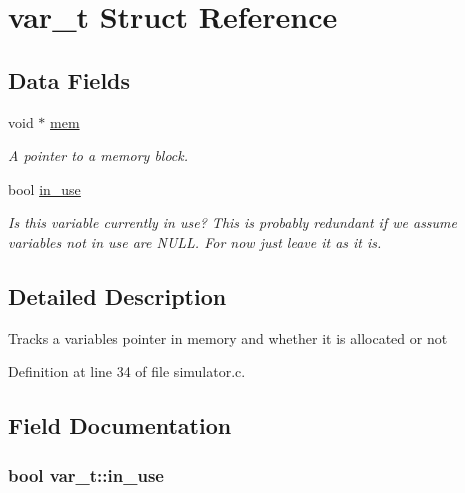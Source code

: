 \hypertarget{structvar__t}{}\section{var\+\_\+t Struct Reference}
\label{structvar__t}
\subsection*{Data Fields}
\begin{DoxyCompactItemize}
\item 
void $\ast$ \hyperlink{structvar__t_a10c34ec2d6e86f971cf9702a4651267d}{mem}
\begin{DoxyCompactList}\small\item\em A pointer to a memory block. \end{DoxyCompactList}\item 
bool \hyperlink{structvar__t_ac304039a94e589f7d11f4ec3353abab4}{in\+\_\+use}
\begin{DoxyCompactList}\small\item\em Is this variable currently in use? This is probably redundant if we assume variables not in use are N\+U\+LL. For now just leave it as it is. \end{DoxyCompactList}\end{DoxyCompactItemize}


\subsection{Detailed Description}
Tracks a variable\textquotesingle{}s pointer in memory and whether it is allocated or not 

Definition at line 34 of file simulator.\+c.



\subsection{Field Documentation}
\subsubsection[{\texorpdfstring{in\+\_\+use}{in_use}}]{\setlength{\rightskip}{0pt plus 5cm}bool var\+\_\+t\+::in\+\_\+use}\hypertarget{structvar__t_ac304039a94e589f7d11f4ec3353abab4}{}\label{structvar__t_ac304039a94e589f7d11f4ec3353abab4}


